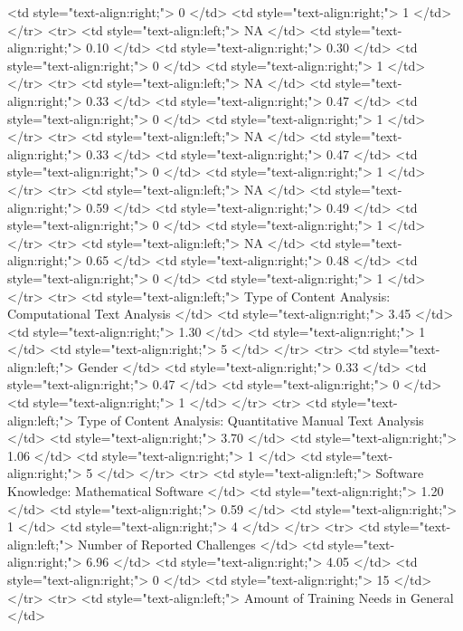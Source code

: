    <td style="text-align:right;"> 0 </td>
   <td style="text-align:right;"> 1 </td>
  </tr>
  <tr>
   <td style="text-align:left;"> NA </td>
   <td style="text-align:right;"> 0.10 </td>
   <td style="text-align:right;"> 0.30 </td>
   <td style="text-align:right;"> 0 </td>
   <td style="text-align:right;"> 1 </td>
  </tr>
  <tr>
   <td style="text-align:left;"> NA </td>
   <td style="text-align:right;"> 0.33 </td>
   <td style="text-align:right;"> 0.47 </td>
   <td style="text-align:right;"> 0 </td>
   <td style="text-align:right;"> 1 </td>
  </tr>
  <tr>
   <td style="text-align:left;"> NA </td>
   <td style="text-align:right;"> 0.33 </td>
   <td style="text-align:right;"> 0.47 </td>
   <td style="text-align:right;"> 0 </td>
   <td style="text-align:right;"> 1 </td>
  </tr>
  <tr>
   <td style="text-align:left;"> NA </td>
   <td style="text-align:right;"> 0.59 </td>
   <td style="text-align:right;"> 0.49 </td>
   <td style="text-align:right;"> 0 </td>
   <td style="text-align:right;"> 1 </td>
  </tr>
  <tr>
   <td style="text-align:left;"> NA </td>
   <td style="text-align:right;"> 0.65 </td>
   <td style="text-align:right;"> 0.48 </td>
   <td style="text-align:right;"> 0 </td>
   <td style="text-align:right;"> 1 </td>
  </tr>
  <tr>
   <td style="text-align:left;"> Type of Content Analysis: Computational Text Analysis </td>
   <td style="text-align:right;"> 3.45 </td>
   <td style="text-align:right;"> 1.30 </td>
   <td style="text-align:right;"> 1 </td>
   <td style="text-align:right;"> 5 </td>
  </tr>
  <tr>
   <td style="text-align:left;"> Gender </td>
   <td style="text-align:right;"> 0.33 </td>
   <td style="text-align:right;"> 0.47 </td>
   <td style="text-align:right;"> 0 </td>
   <td style="text-align:right;"> 1 </td>
  </tr>
  <tr>
   <td style="text-align:left;"> Type of Content Analysis: Quantitative Manual Text Analysis </td>
   <td style="text-align:right;"> 3.70 </td>
   <td style="text-align:right;"> 1.06 </td>
   <td style="text-align:right;"> 1 </td>
   <td style="text-align:right;"> 5 </td>
  </tr>
  <tr>
   <td style="text-align:left;"> Software Knowledge: Mathematical Software </td>
   <td style="text-align:right;"> 1.20 </td>
   <td style="text-align:right;"> 0.59 </td>
   <td style="text-align:right;"> 1 </td>
   <td style="text-align:right;"> 4 </td>
  </tr>
  <tr>
   <td style="text-align:left;"> Number of Reported Challenges </td>
   <td style="text-align:right;"> 6.96 </td>
   <td style="text-align:right;"> 4.05 </td>
   <td style="text-align:right;"> 0 </td>
   <td style="text-align:right;"> 15 </td>
  </tr>
  <tr>
   <td style="text-align:left;"> Amount of Training Needs in General </td>

